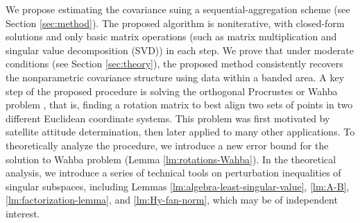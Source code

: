 \documentclass[11pt]{article}
\newcommand{\0}{{\mathbf{0}}}
\newcommand{\1}{{\mathbf{1}}}
\begin{document}
We propose estimating the covariance suing a sequential-aggregation scheme (see Section \ref{sec:method}). The proposed algorithm is noniterative, with closed-form solutions and only basic matrix operations (such as matrix multiplication and singular value decomposition (SVD)) in each step. We prove that under moderate conditions (see Section \ref{sec:theory}), the proposed method consistently recovers the nonparametric covariance structure using data within a banded area. A key step of the proposed procedure is solving the orthogonal Procrustes or Wahba problem \citep{wahba1965least}, that is, finding a rotation matrix to best align two sets of points in two different Euclidean coordinate systems. This problem was first motivated by satellite attitude determination, then later applied to many other applications. To theoretically analyze the procedure, we introduce a new error bound for the solution to Wahba problem (Lemma \ref{lm:rotations-Wahba}). In the theoretical analysis, we introduce a series of technical tools on perturbation inequalities of singular subspaces, including Lemmas \ref{lm:algebra-least-singular-value}, \ref{lm:A-B}, \ref{lm:factorization-lemma}, and \ref{lm:Hy-fan-norm}, which may be of independent interest.
\end{document}
